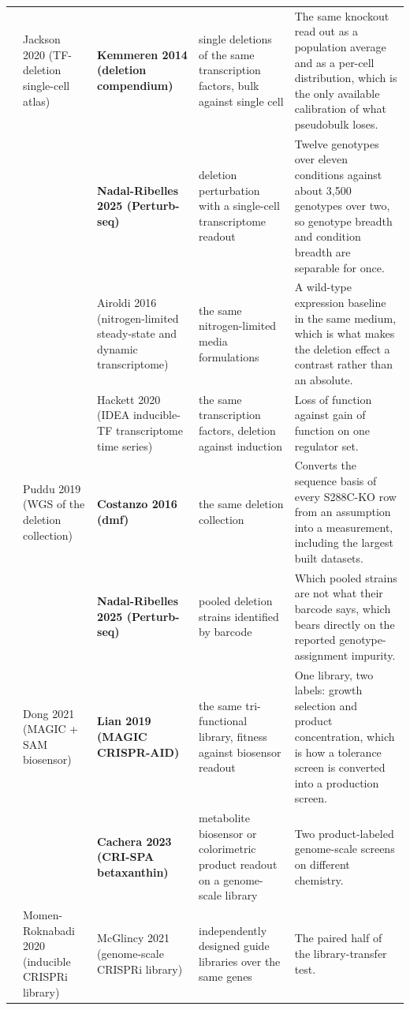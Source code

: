 \begin{landscape}
\begin{longtable}{@{}r@{\hspace{4pt}} L{42mm} L{44mm} L{48mm} L{96mm}@{}}
 & Jackson 2020 (TF-deletion single-cell atlas) & \textbf{Kemmeren 2014 (deletion compendium)} & single deletions of the same transcription factors, bulk against single cell & The same knockout read out as a population average and as a per-cell distribution, which is the only available calibration of what pseudobulk loses. \\
 &  & \textbf{Nadal-Ribelles 2025 (Perturb-seq)} & deletion perturbation with a single-cell transcriptome readout & Twelve genotypes over eleven conditions against about 3,500 genotypes over two, so genotype breadth and condition breadth are separable for once. \\
 &  & Airoldi 2016 (nitrogen-limited steady-state and dynamic transcriptome) & the same nitrogen-limited media formulations & A wild-type expression baseline in the same medium, which is what makes the deletion effect a contrast rather than an absolute. \\
 &  & Hackett 2020 (IDEA inducible-TF transcriptome time series) & the same transcription factors, deletion against induction & Loss of function against gain of function on one regulator set. \\
 & Puddu 2019 (WGS of the deletion collection) & \textbf{Costanzo 2016 (dmf)} & the same deletion collection & Converts the sequence basis of every S288C-KO row from an assumption into a measurement, including the largest built datasets. \\
 &  & \textbf{Nadal-Ribelles 2025 (Perturb-seq)} & pooled deletion strains identified by barcode & Which pooled strains are not what their barcode says, which bears directly on the reported genotype-assignment impurity. \\
 & Dong 2021 (MAGIC + SAM biosensor) & \textbf{Lian 2019 (MAGIC CRISPR-AID)} & the same tri-functional library, fitness against biosensor readout & One library, two labels: growth selection and product concentration, which is how a tolerance screen is converted into a production screen. \\
 &  & \textbf{Cachera 2023 (CRI-SPA betaxanthin)} & metabolite biosensor or colorimetric product readout on a genome-scale library & Two product-labeled genome-scale screens on different chemistry. \\
 & Momen-Roknabadi 2020 (inducible CRISPRi library) & McGlincy 2021 (genome-scale CRISPRi library) & independently designed guide libraries over the same genes & The paired half of the library-transfer test. \\

\end{longtable}
\end{landscape}
